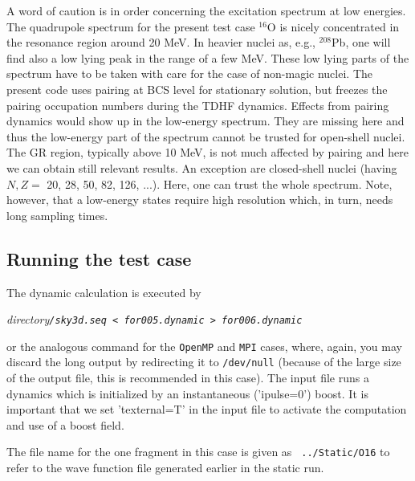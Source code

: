 \documentclass[A4]{elsarticle}
\begin{document}
A word of caution is in order concerning the excitation spectrum at
low energies. The quadrupole spectrum for the present test case
$^{16}$O is nicely concentrated in the resonance region around 20
MeV. In heavier nuclei as, e.g., $^{208}$Pb, one will find also a low
lying peak in the range of a few MeV. These low lying parts of the
spectrum have to be taken with care for the case of non-magic nuclei.
The present code uses pairing at BCS level for stationary solution,
but freezes the pairing occupation numbers during the TDHF dynamics.
Effects from pairing dynamics would show up in the low-energy
spectrum. They are missing here and thus the low-energy part of the
spectrum cannot be trusted for open-shell nuclei. The GR region,
typically above 10 MeV, is not much affected by pairing and here we
can obtain still relevant results. An exception are closed-shell
nuclei (having $N,Z=$ 20, 28, 50, 82, 126, ...). Here, one can
trust the whole spectrum. Note, however, that a low-energy states
require high resolution which, in turn, needs long sampling times.


\subsection{Running the test case}
The dynamic calculation is executed by \\
%
\centerline{\em directory\tt/sky3d.seq < for005.dynamic > for006.dynamic} 
%
or the analogous command for the {\tt OpenMP} and {\tt MPI} cases,
where, again, you may discard the long output by redirecting it to
{\tt /dev/null} (because of the large size of the output file, this is
recommended in this case). The input file runs a dynamics which is
initialized by an instantaneous ('ipulse=0') boost. It is important
that we set 'texternal=T' in the input file to activate the
computation and use of a boost field. 

The file name for the one fragment in this case is given as {\tt
  ../Static/O16} to refer to the wave function file generated earlier
in the static run.
\end{document}
